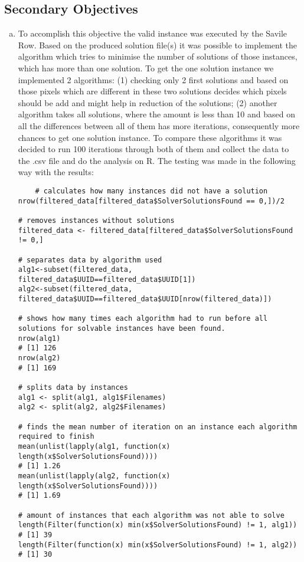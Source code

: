 \subsection{Secondary Objectives}
\label{subsec:completeness_obj}
\begin{enumerate}[(a)]
    \item To accomplish this objective the valid instance was executed by the Savile Row. Based on the produced solution file(s) it was possible to implement the algorithm which tries to minimise the number of solutions of those instances, which has more than one solution. To get the one solution instance we implemented 2 algorithms: (1) checking only 2 first solutions and based on those pixels which are different in these two solutions decides which pixels should be add and might help in reduction of the solutions; (2) another algorithm takes all solutions, where the amount is less than 10 and based on all the differences between all of them has more iterations, consequently more chances to get one solution instance. To compare these algorithms it was decided to run 100 iterations through both of them and collect the data to the .csv file and do the analysis on R. The testing was made in the following way with the results:
    \begin{verbatim}
	# calculates how many instances did not have a solution
nrow(filtered_data[filtered_data$SolverSolutionsFound == 0,])/2

# removes instances without solutions
filtered_data <- filtered_data[filtered_data$SolverSolutionsFound != 0,]

# separates data by algorithm used
alg1<-subset(filtered_data, filtered_data$UUID==filtered_data$UUID[1])
alg2<-subset(filtered_data, filtered_data$UUID==filtered_data$UUID[nrow(filtered_data)])

# shows how many times each algorithm had to run before all solutions for solvable instances have been found.
nrow(alg1)
# [1] 126
nrow(alg2)
# [1] 169

# splits data by instances
alg1 <- split(alg1, alg1$Filenames)
alg2 <- split(alg2, alg2$Filenames)

# finds the mean number of iteration on an instance each algorithm required to finish
mean(unlist(lapply(alg1, function(x) length(x$SolverSolutionsFound))))
# [1] 1.26
mean(unlist(lapply(alg2, function(x) length(x$SolverSolutionsFound))))
# [1] 1.69

# amount of instances that each algorithm was not able to solve 
length(Filter(function(x) min(x$SolverSolutionsFound) != 1, alg1))
# [1] 39
length(Filter(function(x) min(x$SolverSolutionsFound) != 1, alg2))
# [1] 30
\end{verbatim}


\end{enumerate}
